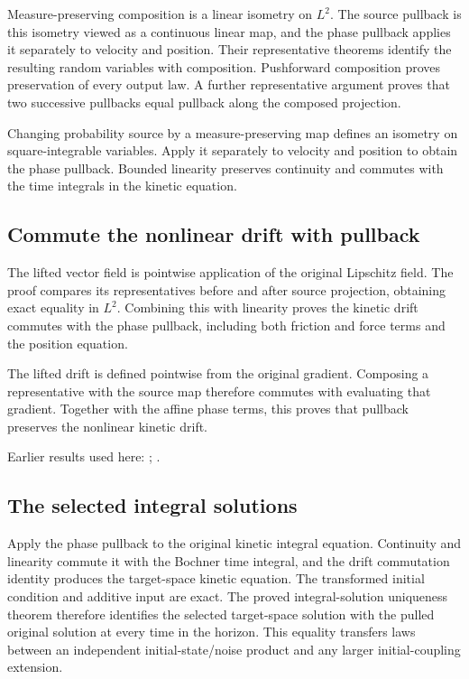 \documentclass[11pt,a4paper]{report}
\begin{document}
Measure-preserving composition is a linear isometry on \(L^{2}\). The source pullback is this isometry viewed as a continuous linear map, and the phase pullback applies it separately to velocity and position. Their representative theorems identify the resulting random variables with composition. Pushforward composition proves preservation of every output law. A further representative argument proves that two successive pullbacks equal pullback along the composed projection.



Changing probability source by a measure-preserving map defines an isometry on square-integrable variables. Apply it separately to velocity and position to obtain the phase pullback. Bounded linearity preserves continuity and commutes with the time integrals in the kinetic equation.

\subsection{\texorpdfstring{Commute the nonlinear drift with pullback}{Commute the nonlinear drift with pullback}}
\label{report-step-KineticLangevin-FlowPullback-lean-2}


The lifted vector field is pointwise application of the original Lipschitz field. The proof compares its representatives before and after source projection, obtaining exact equality in \(L^{2}\). Combining this with linearity proves the kinetic drift commutes with the phase pullback, including both friction and force terms and the position equation.



The lifted drift is defined pointwise from the original gradient. Composing a representative with the source map therefore commutes with evaluating that gradient. Together with the affine phase terms, this proves that pullback preserves the nonlinear kinetic drift.



Earlier results used here: \cite[Section~3.13.2]{LangevinLean2026ULASC}; \cite[Section~3.13.3]{LangevinLean2026ULASC}.
\subsection{\texorpdfstring{The selected integral solutions}{The selected integral solutions}}
\label{report-step-KineticLangevin-FlowPullback-lean-3}


Apply the phase pullback to the original kinetic integral equation. Continuity and linearity commute it with the Bochner time integral, and the drift commutation identity produces the target-space kinetic equation. The transformed initial condition and additive input are exact. The proved integral-solution uniqueness theorem therefore identifies the selected target-space solution with the pulled original solution at every time in the horizon. This equality transfers laws between an independent initial-state/\allowbreak{}noise product and any larger initial-coupling extension.
\end{document}
